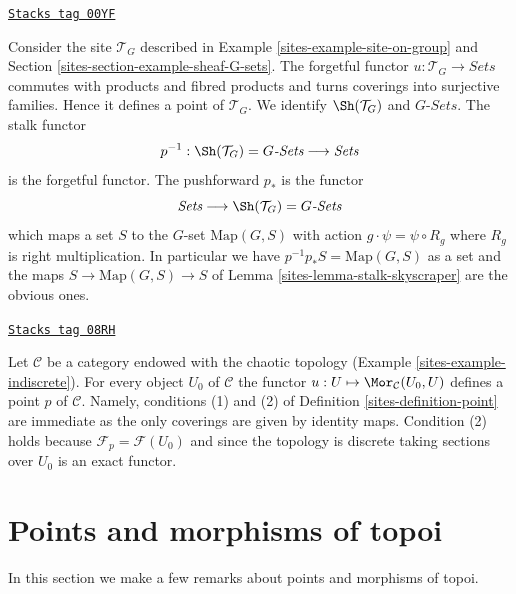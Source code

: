 \begin{example}
\label{sites-example-point-G-sets}
\href{https://stacks.math.columbia.edu/tag/00YF}{\texttt{Stacks tag 00YF}}

Consider the site $\mathcal{T}_G$ described in
Example \ref{sites-example-site-on-group} and
Section \ref{sites-section-example-sheaf-G-sets}.
The forgetful functor $u : \mathcal{T}_G \to \textit{Sets}$
commutes with products and fibred products and turns
coverings into surjective families. Hence it defines a point
of $\mathcal{T}_G$. We identify $\Sh(\mathcal{T}_G)$
and $G\textit{-Sets}$. The stalk functor
$$
p^{-1} :
\Sh(\mathcal{T}_G) = G\textit{-Sets}
\longrightarrow
\textit{Sets}
$$
is the forgetful functor. The pushforward $p_*$ is the
functor
$$
\textit{Sets}
\longrightarrow
\Sh(\mathcal{T}_G) = G\textit{-Sets}
$$
which maps a set $S$ to the $G$-set $\text{Map}(G, S)$ with
action $g \cdot \psi = \psi \circ R_g$ where $R_g$ is right
multiplication. In particular we have
$p^{-1}p_*S = \text{Map}(G, S)$ as a set and the maps
$S \to \text{Map}(G, S) \to S$ of
Lemma \ref{sites-lemma-stalk-skyscraper}
are the obvious ones.
\end{example}

\begin{example}
\label{sites-example-indiscrete-points}
\href{https://stacks.math.columbia.edu/tag/08RH}{\texttt{Stacks tag 08RH}}

Let $\mathcal{C}$ be a category endowed with the chaotic topology
(Example \ref{sites-example-indiscrete}). For every object $U_0$ of $\mathcal{C}$
the functor $u : U \mapsto \Mor_\mathcal{C}(U_0, U)$ defines a point
$p$ of $\mathcal{C}$. Namely, conditions (1) and (2) of
Definition \ref{sites-definition-point} are immediate as the only coverings
are given by identity maps. Condition (2) holds because
$\mathcal{F}_p = \mathcal{F}(U_0)$ and since the topology is discrete
taking sections over $U_0$ is an exact functor.
\end{example}

\section{Points and morphisms of topoi}
\label{sites-section-functorial-points}
In this section we make a few remarks about points and morphisms
of topoi.

